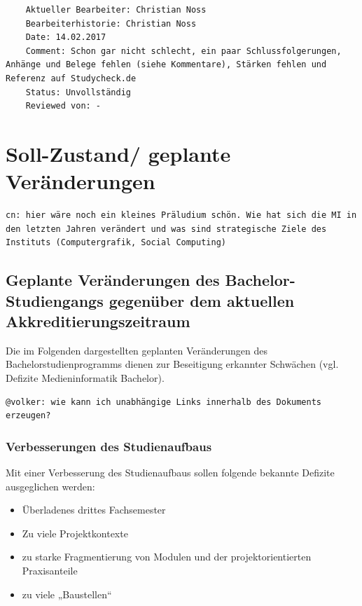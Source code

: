\begin{verbatim}
    Aktueller Bearbeiter: Christian Noss
    Bearbeiterhistorie: Christian Noss
    Date: 14.02.2017
    Comment: Schon gar nicht schlecht, ein paar Schlussfolgerungen, Anhänge und Belege fehlen (siehe Kommentare), Stärken fehlen und Referenz auf Studycheck.de
    Status: Unvollständig
    Reviewed von: -
\end{verbatim}

\chapter{Soll-Zustand/ geplante
Veränderungen}\label{soll-zustand-geplante-veruxe4nderungen}

\begin{verbatim}
cn: hier wäre noch ein kleines Präludium schön. Wie hat sich die MI in den letzten Jahren verändert und was sind strategische Ziele des Instituts (Computergrafik, Social Computing)
\end{verbatim}

\section{Geplante Veränderungen des Bachelor-Studiengangs gegenüber
dem aktuellen
Akkreditierungszeitraum}\label{geplante-veruxe4nderungen-des-bachelor-studiengangs-gegenuxfcber-dem-aktuellen-akkreditierungszeitraum}

Die im Folgenden dargestellten geplanten Veränderungen des
Bachelorstudienprogramms dienen zur Beseitigung erkannter Schwächen
(vgl. Defizite Medieninformatik Bachelor).

\begin{verbatim}
@volker: wie kann ich unabhängige Links innerhalb des Dokuments erzeugen?
\end{verbatim}

\subsection{Verbesserungen des
Studienaufbaus}\label{verbesserungen-des-studienaufbaus}

Mit einer Verbesserung des Studienaufbaus sollen folgende bekannte
Defizite ausgeglichen werden:

\begin{itemize}
\tightlist
\item
  Überladenes drittes Fachsemester
\item
  Zu viele Projektkontexte
\item
  zu starke Fragmentierung von Modulen und der projektorientierten
  Praxisanteile
\item
  zu viele „Baustellen``
\end{itemize}

